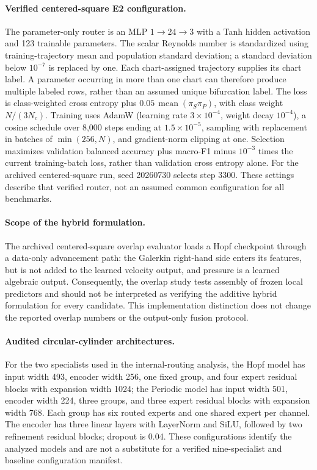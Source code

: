 \documentclass{article}
\begin{document}
\paragraph{Verified centered-square E2 configuration.}
The parameter-only router is an MLP $1\to24\to3$ with a Tanh hidden activation and 123 trainable parameters. The scalar Reynolds number is standardized using training-trajectory mean and population standard deviation; a standard deviation below $10^{-7}$ is replaced by one. Each chart-assigned trajectory supplies its chart label. A parameter occurring in more than one chart can therefore produce multiple labeled rows, rather than an assumed unique bifurcation label. The loss is class-weighted cross entropy plus $0.05\,\operatorname{mean}(\pi_S\pi_P)$, with class weight $N/(3N_c)$. Training uses AdamW (learning rate $3\times10^{-4}$, weight decay $10^{-4}$), a cosine schedule over 8,000 steps ending at $1.5\times10^{-5}$, sampling with replacement in batches of $\min(256,N)$, and gradient-norm clipping at one. Selection maximizes validation balanced accuracy plus macro-F1 minus $10^{-3}$ times the current training-batch loss, rather than validation cross entropy alone. For the archived centered-square run, seed 20260730 selects step 3300. These settings describe that verified router, not an assumed common configuration for all benchmarks.

\paragraph{Scope of the hybrid formulation.}
The archived centered-square overlap evaluator loads a Hopf checkpoint through a data-only advancement path: the Galerkin right-hand side enters its features, but is not added to the learned velocity output, and pressure is a learned algebraic output. Consequently, the overlap study tests assembly of frozen local predictors and should not be interpreted as verifying the additive hybrid formulation for every candidate. This implementation distinction does not change the reported overlap numbers or the output-only fusion protocol.

\paragraph{Audited circular-cylinder architectures.}
For the two specialists used in the internal-routing analysis, the Hopf model has input width 493, encoder width 256, one fixed group, and four expert residual blocks with expansion width 1024; the Periodic model has input width 501, encoder width 224, three groups, and three expert residual blocks with expansion width 768. Each group has six routed experts and one shared expert per channel. The encoder has three linear layers with LayerNorm and SiLU, followed by two refinement residual blocks; dropout is 0.04. These configurations identify the analyzed models and are not a substitute for a verified nine-specialist and baseline configuration manifest.
\end{document}
